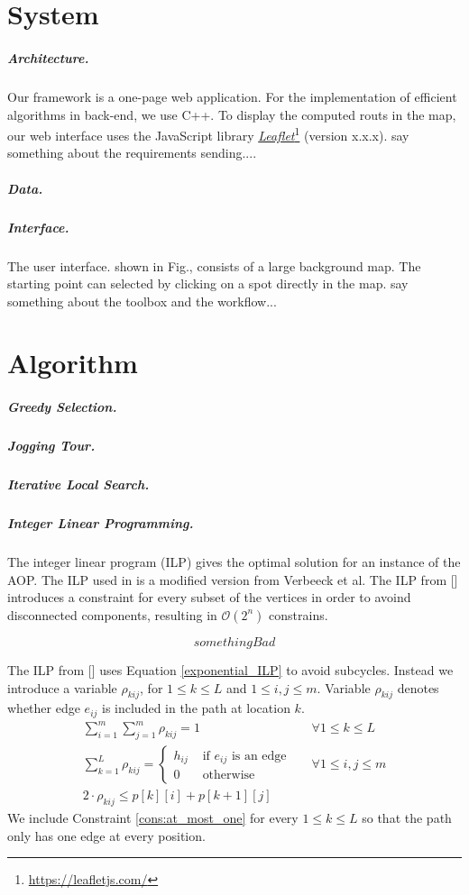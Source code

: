 \documentclass[sigconf,natbib=false]{acmart}
\begin{document}
\section{System}
\label{sec:system}
\subparagraph*{\textbf{Architecture.}}
Our framework is a one-page web application. For the implementation of efficient algorithms in back-end, we use C++. To display the computed routs in the map, our web interface uses the JavaScript library \href{https://leafletjs.com/}{\emph{Leaflet}}\footnote{\url{https://leafletjs.com/}} 
(version x.x.x). say something about the requirements sending....
\subparagraph*{\textbf{Data.}}

\subparagraph*{\textbf{Interface.}}
The user interface. shown in Fig., consists of a large background map. The starting point can selected by clicking on a spot directly in the map. 
say something about the toolbox and the workflow... 
\section{Algorithm}
\label{sec:algo}
\subparagraph*{\textbf{Greedy Selection.}}


\subparagraph*{\textbf{Jogging Tour.}}

\subparagraph*{\textbf{Iterative Local Search.}}

\subparagraph*{\textbf{Integer Linear Programming.}}
The integer linear program (ILP) gives the optimal solution for an instance of the AOP. The ILP used in \tG is a modified version from Verbeeck et al. 
The ILP from [] introduces a constraint for every subset of the vertices in order to avoind disconnected components, resulting in $\mathcal{O}(2^n)$ constrains.

\begin{equation}
  something Bad
  \label{exponential_ILP}
\end{equation}

The ILP from [] uses Equation \ref{exponential_ILP} to avoid subcycles. Instead we introduce a variable $\rho_{kij}$, for $1 \leq k \leq L$ and $1 \leq i, j \leq m$. Variable $\rho_{kij}$ denotes whether edge $e_{ij}$ is included in the path at location $k$.
\begin{align}
  \sum_{i=1}^m \sum_{j=1}^m \rho_{kij} = 1 &&\forall 1 \leq k \leq L \label{cons:at_most_one}\\
  \sum_{k=1}^L \rho_{kij} = \begin{cases} h_{ij} &\text{ if } e_{ij} \text{ is an edge} \\
    0 &\text{ otherwise}
  \end{cases} && \forall 1 \leq i, j \leq m \label{cons:sum_h_zero}\\
  2 \cdot \rho_{kij} \leq p[k][i] + p[k+1][j]
\end{align}
We include Constraint \ref{cons:at_most_one} for every $1 \leq k \leq L$ so that the path only has one edge at every position.
\end{document}
